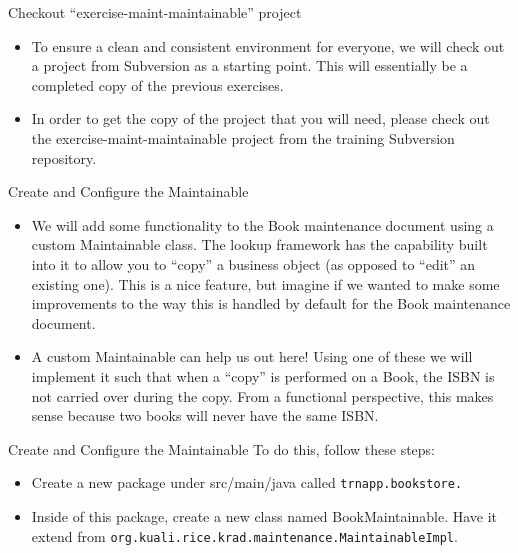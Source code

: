 \documentclass[xcolor=dvipsnames,14pt,professionalfonts]{beamer}
\begin{document}
\begin{frame}{Checkout “exercise-maint-maintainable” project}
  \begin{itemize}
    \item To ensure a clean and consistent environment for everyone, we will check out a project from Subversion as a starting point.  This will essentially be a completed copy of the previous exercises.
    \item In order to get the copy of the project that you will need,
      please check out the exercise-maint-maintainable project from
      the training Subversion repository.
      \end{itemize}
    \end{frame}
    
    \begin{frame}{Create and Configure the Maintainable}
      \begin{itemize}
      \item We will add some functionality to the Book maintenance document using a custom Maintainable class.  The lookup framework has the capability built into it to allow you to “copy” a business object (as opposed to “edit” an existing one).  This is a nice feature, but imagine if we wanted to make some improvements to the way this is handled by default for the Book maintenance document.
      \item A custom Maintainable can help us out here!  Using one of
        these we will implement it such that when a “copy” is
        performed on a Book, the ISBN is not carried over during the
        copy.  From a functional perspective, this makes sense because
        two books will never have the same ISBN.
      \end{itemize}     
    \end{frame}

    \begin{frame}{Create and Configure the Maintainable}
 To do this, follow these steps:
      \begin{itemize}
      \item Create a new package under src/main/java called \texttt{trnapp.bookstore.}
      \item Inside of this package, create a new class named
        BookMaintainable.  Have it extend from
        \texttt{org.kuali.rice.krad.maintenance.MaintainableImpl}.
      \end{itemize}     
    \end{frame}
 
\end{document}
